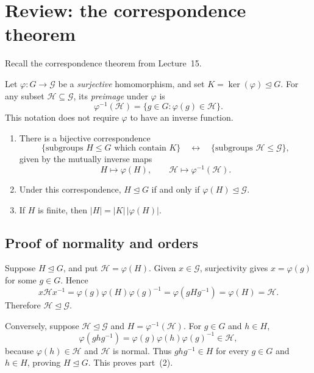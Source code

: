 \documentclass[reqno,11pt]{amsart}
\begin{document}
\raggedbottom
\makelecturetitle

\section{Review: the correspondence theorem}

Recall the correspondence theorem from Lecture~15.

Let $\varphi:G\to\mathcal G$ be a \emph{surjective} homomorphism, and set
$K=\ker(\varphi)\trianglelefteq G$.
For any subset $\mathcal H\subseteq\mathcal G$, its \emph{preimage}
under $\varphi$ is
\[
  \varphi^{-1}(\mathcal H)=\{g\in G:\varphi(g)\in\mathcal H\}.
\]
This notation does not require $\varphi$ to have an inverse function.

\begin{theorem}\label{thm:correspondence}
\leavevmode
\begin{enumerate}[label=\textbf{(\arabic*)}]
  \item There is a bijective correspondence
  \[
    \{\text{subgroups } H\leq G \text{ which contain } K \}\quad\longleftrightarrow\quad
    \{\text{subgroups } \mathcal H\leq\mathcal G\},
  \]
  given by the mutually inverse maps
  \[
    H\longmapsto\varphi(H),\qquad
    \mathcal H\longmapsto\varphi^{-1}(\mathcal H).
  \]
  \item Under this correspondence,
  $H\trianglelefteq G$ if and only if
  $\varphi(H)\trianglelefteq\mathcal G$.
  \item If $H$ is finite, then $|H|=|K|\,|\varphi(H)|$.
\end{enumerate}
\end{theorem}

\subsection{Proof of normality and orders}

Suppose $H\trianglelefteq G$, and put $\mathcal H=\varphi(H)$.
Given $x\in\mathcal G$, surjectivity gives $x=\varphi(g)$ for some
$g\in G$. Hence
\[
  x\mathcal Hx^{-1}
  =\varphi(g)\varphi(H)\varphi(g)^{-1}
  =\varphi(gHg^{-1})
  =\varphi(H)=\mathcal H.
\]
Therefore $\mathcal H\trianglelefteq\mathcal G$.

Conversely, suppose $\mathcal H\trianglelefteq\mathcal G$ and
$H=\varphi^{-1}(\mathcal H)$. For $g\in G$ and $h\in H$,
\[
  \varphi(ghg^{-1})=\varphi(g)\varphi(h)\varphi(g)^{-1}\in\mathcal H,
\]
because $\varphi(h)\in\mathcal H$ and $\mathcal H$ is normal.
Thus $ghg^{-1}\in H$ for every $g\in G$ and $h\in H$, proving
$H\trianglelefteq G$. This proves part~(2).
\end{document}
